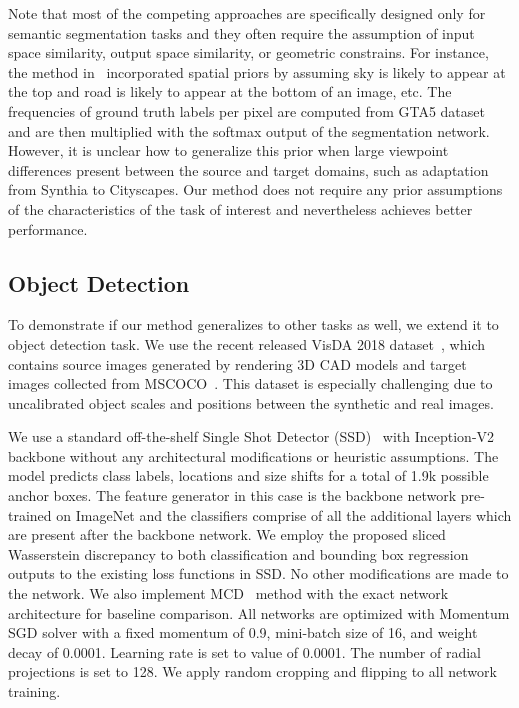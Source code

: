 \documentclass[10pt,twocolumn,letterpaper]{article}
\begin{document}
Note that most of the competing approaches are specifically designed only for semantic segmentation tasks and they often require the assumption of input space similarity, output space similarity, or geometric constrains. For instance, the method in~\cite{zou2018unsupervised} incorporated spatial priors by assuming sky is likely to appear at the top and road is likely to appear at the bottom of an image, etc. The frequencies of ground truth labels per pixel are computed from GTA5 dataset and are then multiplied with the softmax output of the segmentation network. However, it is unclear how to generalize this prior when large viewpoint differences present between the source and target domains, such as adaptation from Synthia to Cityscapes. Our method does not require any prior assumptions of the characteristics of the task of interest and nevertheless achieves better performance.


\subsection{Object Detection}
To demonstrate if our method generalizes to other tasks as well, we extend it to object detection task. We use the recent released VisDA 2018 dataset~\cite{peng2018syn2real}, which contains source images generated by rendering 3D CAD models and target images collected from MSCOCO~\cite{lin2014microsoft}. This dataset is especially challenging due to uncalibrated object scales and positions between the synthetic and real images.

We use a standard off-the-shelf Single Shot Detector (SSD)~\cite{liu2016ssd} with Inception-V2~\cite{szegedy2016rethinking} backbone without any architectural modifications or heuristic assumptions. The model predicts class labels, locations and size shifts for a total of 1.9k possible anchor boxes. The feature generator in this case is the backbone network pre-trained on ImageNet and the classifiers comprise of all the additional layers which are present after the backbone network. We employ the proposed sliced Wasserstein discrepancy to both classification and bounding box regression outputs to the existing loss functions in SSD. No other modifications are made to the network. We also implement MCD~\cite{saito2017maximum} method with the exact network architecture for baseline comparison. All networks are optimized with Momentum SGD solver with a fixed momentum of 0.9, mini-batch size of 16, and weight decay of 0.0001. Learning rate is set to value of 0.0001. The number of radial projections  is set to 128. We apply random cropping and flipping to all network training.
\end{document}
